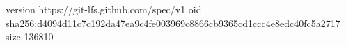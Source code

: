 version https://git-lfs.github.com/spec/v1
oid sha256:d4094d11c7c192da47ea9c4fe003969c8866cb9365cd1ccc4e8edc40fc5a2717
size 136810
